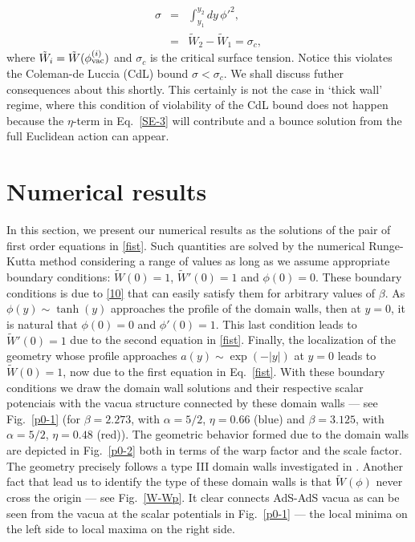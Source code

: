 \documentclass[aps,12pt, a4paper,nofootinbib]{revtex4}
\begin{document}
{\begin{eqnarray}\label{SE-8}
\sigma&=&\int_{y_1}^{y_2}{\!\!\!dy\, \phi'^2},\nonumber\\
&=&\tilde{W}_2-\tilde{W}_1=\sigma_c,
\end{eqnarray}
where $\tilde{W}_i=\tilde{W}(\phi^{(i)}_{\rm vac})$ and $\sigma_c$ is the critical surface tension. Notice this violates the Coleman-de Luccia (CdL) \cite{Coleman:1980aw}  bound $\sigma<\sigma_c$. We shall discuss futher consequences about this shortly. This certainly is not the case in `thick wall' regime, where this condition of violability of the CdL bound does not happen because the $\eta$-term in Eq.~\eqref{SE-3} will contribute and a bounce solution from the full Euclidean action can appear.

\section{Numerical results}
\label{z2}

In this section, we present our numerical results as the solutions of the pair of first order equations in \eqref{fist}. Such quantities are solved by the numerical Runge-Kutta method considering a range of values as long as we assume appropriate boundary conditions:  
$\tilde{W}(0)=1$, $\tilde{W}'(0)=1$ and $\phi(0)=0$. These boundary conditions is due to \eqref{10} that can easily satisfy them for arbitrary values of $\beta$. As $\phi(y)\sim\tanh{(y)}$ approaches the profile of the domain walls, then at $y=0$, it is natural that $\phi(0)=0$ and $\phi' (0)=1$. This last condition leads to $\tilde{W}'(0)=1$ due to the second equation in \eqref{fist}. Finally, the localization of the geometry whose profile approaches  $a(y)\sim\exp{(- |y|)}$ at $y=0$ leads to $\tilde{W}(0)=1$, now due to the first equation in Eq.~\eqref{fist}. With these boundary conditions we draw the domain wall solutions and their respective scalar potenciais with the vacua structure connected by these domain walls ---  
see Fig.~\ref{p0-1} (for $\beta=2.273$, with $\alpha=5/2$, $\eta=0.66$ (blue) and $\beta=3.125$, with $\alpha=5/2$, $\eta=0.48$ (red)). The geometric behavior formed due to the domain walls are depicted in Fig.~\ref{p0-2} both in terms of the warp factor and the scale factor. The geometry precisely follows a type III domain walls investigated in \cite{Cvetic:1996vr}. Another fact that lead us to identify the type of these domain walls is that $\tilde{W}(\phi)$ never cross the origin --- see Fig.~\ref{W-Wp}.  It clear connects AdS-AdS vacua as can be seen from the vacua at the scalar potentials in Fig.~\ref{p0-1} --- the local minima on the left side to local maxima on the right side.


}
\end{document}

